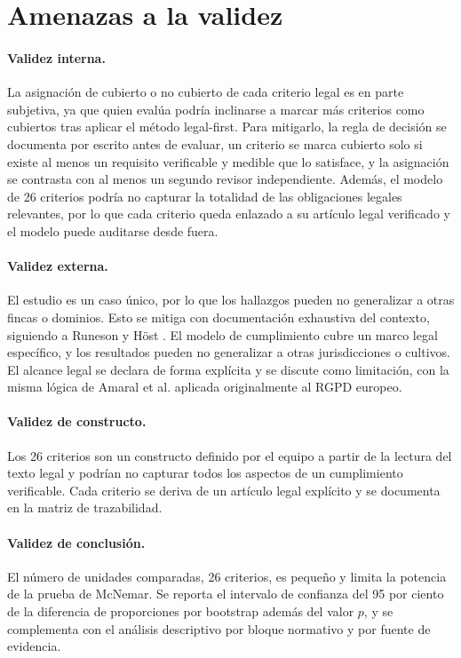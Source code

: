 \documentclass[pdflatex,sn-mathphys-num]{sn-jnl}
\begin{document}
\section{Amenazas a la validez}\label{sec:amenazas}

\paragraph{Validez interna.} La asignaci\'on de cubierto o no cubierto de cada criterio legal es en parte subjetiva, ya que quien eval\'ua podr\'ia inclinarse a marcar m\'as criterios como cubiertos tras aplicar el m\'etodo legal-first. Para mitigarlo, la regla de decisi\'on se documenta por escrito antes de evaluar, un criterio se marca cubierto solo si existe al menos un requisito verificable y medible que lo satisface, y la asignaci\'on se contrasta con al menos un segundo revisor independiente. Adem\'as, el modelo de 26 criterios podr\'ia no capturar la totalidad de las obligaciones legales relevantes, por lo que cada criterio queda enlazado a su art\'iculo legal verificado y el modelo puede auditarse desde fuera.

\paragraph{Validez externa.} El estudio es un caso \'unico, por lo que los hallazgos pueden no generalizar a otras fincas o dominios. Esto se mitiga con documentaci\'on exhaustiva del contexto, siguiendo a Runeson y H\"ost \cite{runeson2009}. El modelo de cumplimiento cubre un marco legal espec\'ifico, y los resultados pueden no generalizar a otras jurisdicciones o cultivos. El alcance legal se declara de forma expl\'icita y se discute como limitaci\'on, con la misma l\'ogica de Amaral et al. \cite{amaral2021} aplicada originalmente al RGPD europeo.

\paragraph{Validez de constructo.} Los 26 criterios son un constructo definido por el equipo a partir de la lectura del texto legal y podr\'ian no capturar todos los aspectos de un cumplimiento verificable. Cada criterio se deriva de un art\'iculo legal expl\'icito y se documenta en la matriz de trazabilidad.

\paragraph{Validez de conclusi\'on.} El n\'umero de unidades comparadas, 26 criterios, es peque\~no y limita la potencia de la prueba de McNemar. Se reporta el intervalo de confianza del 95 por ciento de la diferencia de proporciones por bootstrap adem\'as del valor $p$, y se complementa con el an\'alisis descriptivo por bloque normativo y por fuente de evidencia.
\end{document}
